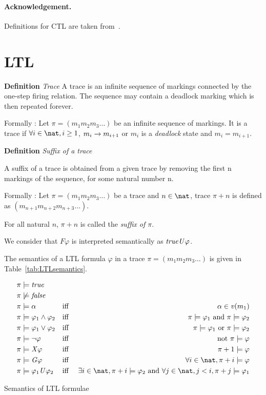 \documentclass{article}
\begin{document}
\paragraph{Acknowledgement.} Definitions for CTL are taken from~\cite{BDJJS:PN:18}.

\section{LTL}



\textbf{Definition}
\emph{Trace}
A trace is an infinite sequence of markings connected by the one-step
firing relation. The sequence may contain a deadlock marking which is
then repeated forever.

Formally : Let $\pi = (m_1 m_2 m_3 \ldots)$ be an infinite sequence of markings.
It is a trace if $\forall i \in \nat,  i \geq 1$, $m_{i} \rtrans m_{i+1}$ or $m_i$ is a \emph{deadlock} state and $m_{i} = m_{i+1}$.
\medskip


\textbf{Definition}
\emph{Suffix of a trace}

A suffix of a trace is obtained from a given trace by removing the first n
markings of the sequence, for some natural number n.

Formally : Let $\pi = (m_1 m_2 m_3 \ldots)$ be a trace and $n \in \nat$, trace $\pi+n$
is defined as $(m_{n+1} m_{n+2} m_{n+3} \ldots)$.

For all natural $n$, $\pi+n$ is called the \emph{suffix of $\pi$}. 
\medskip

We consider that $\mathit{F}\varphi$ is interpreted semantically as $\mathit{true} \mathit{U} \varphi$.

The semantics of a LTL formula $\varphi$ in a trace $\pi = (m_1 m_2 m_3 \ldots)$ 
is given in Table~\ref{tab:LTLsemantics}. 

\begin{table}[htbp]
\raggedbottom
\begin{align*} 
    &\pi \models \true && \\
    &\pi \not\models \false &&  \\
    &\pi \models \alpha && \mbox{iff }& \alpha \in \apeval(m_1) \\
	&\pi \models \varphi_1 \land \varphi_2 &&\mbox{iff } &\pi \models \varphi_1 \mbox{ and } \pi \models \varphi_2 \\
	&\pi \models \varphi_1 \lor \varphi_2 &&\mbox{iff }& \pi \models \varphi_1 \mbox{ or } \pi \models \varphi_2 \\
	&\pi \models \neg \varphi&&\mbox{iff }& \mbox{ not } \pi \models \varphi\\
	&\pi \models \mathit{X}\varphi&& \mbox{iff }& \pi+1 \models \varphi  \\ 
	&\pi \models \mathit{G}\varphi&& \mbox{iff }& \forall i \in \nat, \pi+i \models \varphi  \\ 
	&\pi \models \varphi_1 \mathit{U}\varphi_2&& \mbox{iff } &\exists i \in \nat,  \pi+i \models \varphi_2 \mbox{ and } 
		 \forall j \in \nat, j < i, \pi+j \models \varphi_1   
\end{align*}
\caption{Semantics of LTL formulae} \label{tab:LTLsemantics}
\end{table}
\end{document}
